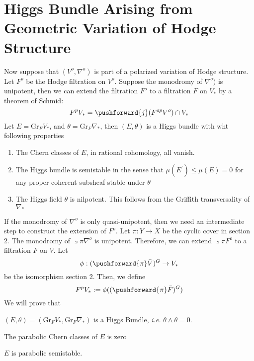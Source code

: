 \documentclass{article}
\newcommand{\Gr}{\text{Gr}}
\begin{document}
\section{Higgs Bundle Arising from Geometric Variation of Hodge Structure}
Now suppose that $(V^o, \nabla^o)$ is part of a polarized variation of Hodge structure.
Let $F^o$ be the Hodge filtration on $V^o$.
Suppose the monodromy of $\nabla^o)$ is unipotent, then we can extend the filtration $F^o$ 
to a filtration $F$ on $V_*$ by a theorem of Schmid:
\[
    F^pV_* = \pushforward{j}(F^{op}V^o)\cap V_*
\]
Let $E = \Gr_FV_*$, and $\theta = \Gr_F\nabla_*$, then $(E, \theta)$ is a Higgs bundle with
wht following properties
\begin{enumerate}
\item The Chern classes of $E$, in rational cohomology, all vanish.
\item The Higgs bundle is semistable in the sense that $\mu(E^\prime) \le \mu(E) = 0$
    for any proper coherent subsheaf stable under $\theta$
\item The Higgs field $\theta$ is nilpotent. This follows from the Griffith transversality
    of $\nabla_*$
\end{enumerate}

If the monodromy of $\nabla^o$ is only quasi-unipotent, then we need an intermediate step 
to construct the extension of $F^o$. Let $\pi: Y \rightarrow X$ be the cyclic cover in section 2.
The monodromy of $\pullback{\pi}\nabla^o$ is unipotent. Therefore, we can extend 
$\pullback{\pi}F^o$ to a filtration $\bar{F}$ on $\bar{V}$. Let
\[
    \phi: (\pushforward{\pi}\bar{V})^{G} \rightarrow V_*
\]
be the isomorphism {\color{red}section 2}. Then, we define
\[
    F^pV_* := \phi((\pushforward{\pi}\bar{F})^G)
\]
We will prove that
\begin{lemma}
$(E, \theta) = (\Gr_FV_*, \Gr_F\nabla_*)$ is a Higgs Bundle, \emph{i.e.} $\theta\wedge\theta = 0$.
\end{lemma}

\begin{lemma}
The parabolic Chern classes of $E$ is zero
\end{lemma}

\begin{lemma}
$E$ is parabolic semistable.
\end{lemma}
\end{document}
